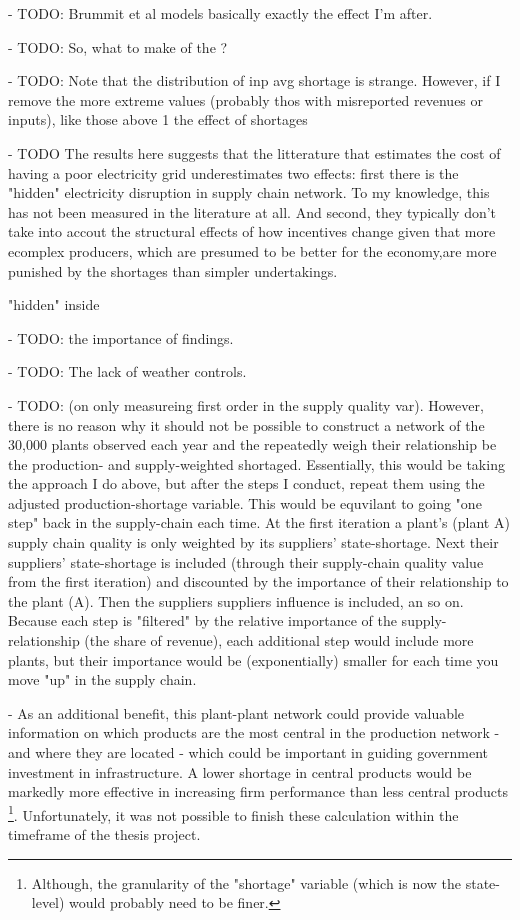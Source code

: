 \documentclass[11pt]{article}
\begin{document}
- TODO: Brummit et al models basically exactly the effect I'm after.

- TODO: So, what to make of the ?

- TODO: Note that the distribution of inp avg shortage is strange. However, if I remove the more extreme values (probably thos with misreported revenues or inputs), like those above 1 the effect of shortages 

- TODO The results here suggests that the litterature that estimates the cost of having a poor electricity grid underestimates two effects: first there is the "hidden" electricity disruption in supply chain network. To my knowledge, this has not been measured in the literature at all. And second, they typically don't take into accout the structural effects of how incentives change given that more ecomplex producers, which are presumed to be better for the economy,are more punished by the shortages than simpler undertakings.

"hidden" inside 

- TODO: the importance of findings.

- TODO: The lack of weather controls.

- TODO: (on only measureing first order in the supply quality var). However, there is no reason why it should not be possible to construct a network of the ~ 30,000 plants observed each year and the repeatedly weigh their relationship be the production- and supply-weighted shortaged. Essentially, this would be taking the approach I do above, but after the steps I conduct, repeat them using the adjusted production-shortage variable. This would be equvilant to going "one step" back in the supply-chain each time. At the first iteration a plant's (plant A) supply chain quality is only weighted by its suppliers' state-shortage. Next their suppliers' state-shortage is included (through their supply-chain quality value from the first iteration) and discounted by the importance of their relationship to the plant (A). Then the suppliers suppliers influence is included, an so on. Because each step is "filtered" by the relative importance of the supply-relationship (the share of revenue), each additional step would include more plants, but their importance would be (exponentially) smaller for each time you move "up" in the supply chain. 

- As an additional benefit, this plant-plant network could provide valuable information on which products are the most central in the production network - and where they are located - which could be important in guiding government investment in infrastructure. A lower shortage in central products would be markedly more effective in increasing firm performance than less central products \footnote{Although, the granularity of the "shortage" variable (which is now the state-level) would probably need to be finer.}. Unfortunately, it was not possible to finish these calculation within the timeframe of the thesis project.
\end{document}
